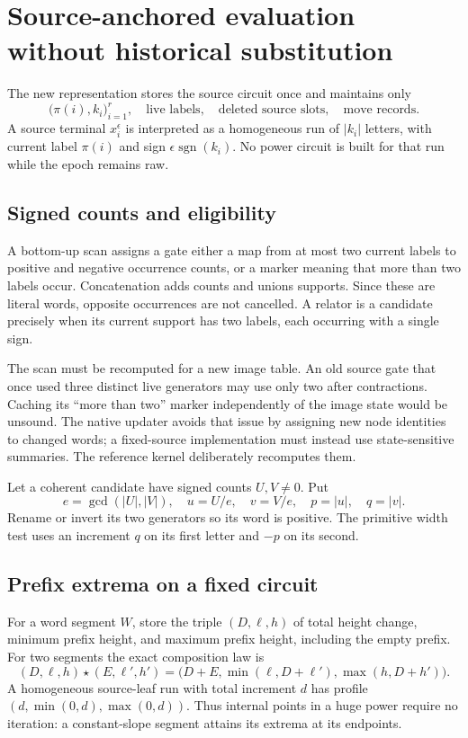 \documentclass[11pt,letterpaper]{article}
\theoremstyle{definition}
\theoremstyle{remark}\newtheorem{remark}[theorem]{Remark}
\newcommand{\sgn}{\operatorname{sgn}}
\begin{document}
\section{Source-anchored evaluation without historical substitution}
\label{sec:implementation}

The new representation stores the source circuit once and maintains only
\[
 \bigl(\pi(i),k_i\bigr)_{i=1}^r,\quad
 \text{live labels},\quad\text{deleted source slots},\quad\text{move records}.
\]
A source terminal $x_i^{\epsilon}$ is interpreted as a homogeneous run of
$|k_i|$ letters, with current label $\pi(i)$ and sign $\epsilon\sgn(k_i)$.
No power circuit is built for that run while the epoch remains raw.

\subsection{Signed counts and eligibility}

A bottom-up scan assigns a gate either a map from at most two current labels
to positive and negative occurrence counts, or a marker meaning that more than
two labels occur. Concatenation adds counts and unions supports. Since these
are literal words, opposite occurrences are not cancelled. A relator is a
candidate precisely when its current support has two labels, each occurring
with a single sign.

The scan must be recomputed for a new image table. An old source gate that
once used three distinct live generators may use only two after contractions.
Caching its ``more than two'' marker independently of the image state would
be unsound. The native updater avoids that issue by assigning new node
identities to changed words; a fixed-source implementation must instead use
state-sensitive summaries. The reference kernel deliberately recomputes them.

Let a coherent candidate have signed counts $U,V\ne0$. Put
\[
 e=\gcd(|U|,|V|),\quad u=U/e,\quad v=V/e,\quad p=|u|,\quad q=|v|.
\]
Rename or invert its two generators so its word is positive. The primitive
width test uses an increment $q$ on its first letter and $-p$ on its second.

\subsection{Prefix extrema on a fixed circuit}

For a word segment $W$, store the triple $(D,\ell,h)$ of total height change,
minimum prefix height, and maximum prefix height, including the empty prefix.
For two segments the exact composition law is
\begin{equation}
 (D,\ell,h)\star(E,\ell',h')=
 \bigl(D+E,\min(\ell,D+\ell'),\max(h,D+h')\bigr).
 \label{eq:profile}
\end{equation}
A homogeneous source-leaf run with total increment $d$ has profile
$(d,\min(0,d),\max(0,d))$. Thus internal points in a huge power require no
iteration: a constant-slope segment attains its extrema at its endpoints.
\end{document}
